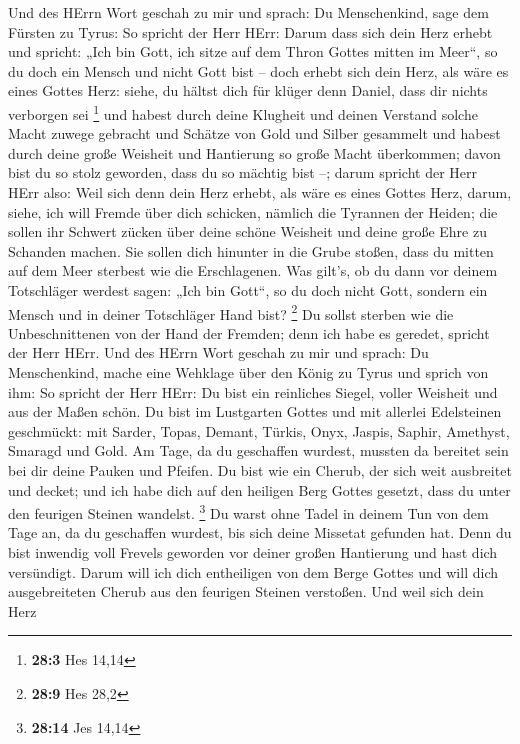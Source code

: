 Und des HErrn Wort geschah zu mir und sprach: 
Du Menschenkind, sage dem Fürsten zu Tyrus: So spricht der Herr HErr:
Darum dass sich dein Herz erhebt und spricht: „Ich bin Gott, ich sitze
auf dem Thron Gottes mitten im Meer``, so du doch ein Mensch und nicht
Gott bist -- doch erhebt sich dein Herz, als wäre es eines Gottes Herz:
 siehe, du hältst dich für klüger denn Daniel, dass dir
nichts verborgen sei \footnote{\textbf{28:3} Hes 14,14}  und
habest durch deine Klugheit und deinen Verstand solche Macht zuwege
gebracht und Schätze von Gold und Silber gesammelt  und
habest durch deine große Weisheit und Hantierung so große Macht
überkommen; davon bist du so stolz geworden, dass du so mächtig bist --;
 darum spricht der Herr HErr also: Weil sich denn dein Herz
erhebt, als wäre es eines Gottes Herz,  darum, siehe, ich
will Fremde über dich schicken, nämlich die Tyrannen der Heiden; die
sollen ihr Schwert zücken über deine schöne Weisheit und deine große
Ehre zu Schanden machen.  Sie sollen dich hinunter in die
Grube stoßen, dass du mitten auf dem Meer sterbest wie die Erschlagenen.
 Was gilt's, ob du dann vor deinem Totschläger werdest
sagen: „Ich bin Gott``, so du doch nicht Gott, sondern ein Mensch und in
deiner Totschläger Hand bist? \footnote{\textbf{28:9} Hes 28,2}
 Du sollst sterben wie die Unbeschnittenen von der Hand der
Fremden; denn ich habe es geredet, spricht der Herr HErr. 
Und des HErrn Wort geschah zu mir und sprach:  Du
Menschenkind, mache eine Wehklage über den König zu Tyrus und sprich von
ihm: So spricht der Herr HErr: Du bist ein reinliches Siegel, voller
Weisheit und aus der Maßen schön.  Du bist im Lustgarten
Gottes und mit allerlei Edelsteinen geschmückt: mit Sarder, Topas,
Demant, Türkis, Onyx, Jaspis, Saphir, Amethyst, Smaragd und Gold. Am
Tage, da du geschaffen wurdest, mussten da bereitet sein bei dir deine
Pauken und Pfeifen.  Du bist wie ein Cherub, der sich weit
ausbreitet und decket; und ich habe dich auf den heiligen Berg Gottes
gesetzt, dass du unter den feurigen Steinen wandelst. \footnote{\textbf{28:14}
  Jes 14,14}  Du warst ohne Tadel in deinem Tun von dem
Tage an, da du geschaffen wurdest, bis sich deine Missetat gefunden hat.
 Denn du bist inwendig voll Frevels geworden vor deiner
großen Hantierung und hast dich versündigt. Darum will ich dich
entheiligen von dem Berge Gottes und will dich ausgebreiteten Cherub aus
den feurigen Steinen verstoßen.  Und weil sich dein Herz
